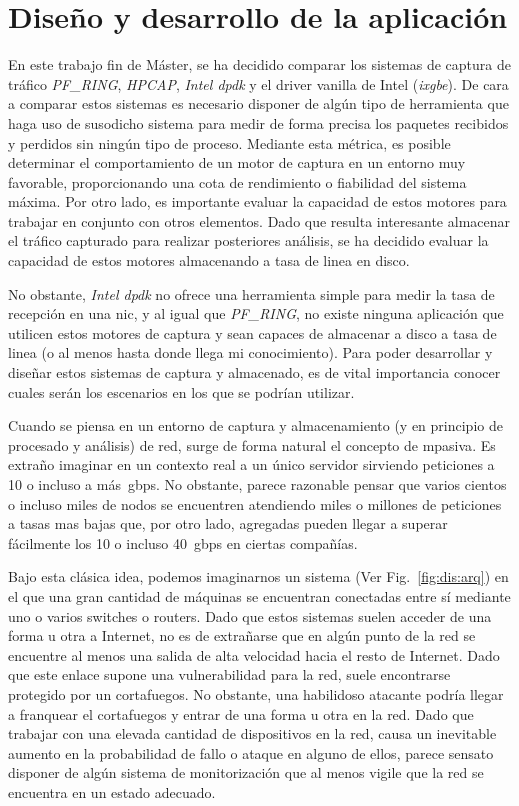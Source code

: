 \chapter{Diseño y desarrollo de la aplicación\label{sec:disenho}}

En este trabajo fin de Máster, se ha decidido comparar los sistemas de captura de tráfico \textit{PF\_RING}, \textit{HPCAP}, \textit{Intel \gls{dpdk}} y el driver \gls{vanilla} de Intel (\textit{ixgbe}).
De cara a comparar estos sistemas es necesario disponer de algún tipo de herramienta que haga uso de susodicho sistema para medir de forma precisa los paquetes recibidos y perdidos sin ningún tipo de proceso.
Mediante esta métrica, es posible determinar el comportamiento de un motor de captura en un entorno muy favorable, proporcionando una cota de rendimiento o fiabilidad del sistema máxima. 
Por otro lado, es importante evaluar la capacidad de estos motores para trabajar en conjunto con otros elementos. Dado que resulta interesante almacenar el tráfico capturado para realizar posteriores análisis, se ha decidido evaluar la capacidad de estos motores almacenando a tasa de linea en disco.

No obstante, \textit{Intel \gls{dpdk}} no ofrece una herramienta simple para medir la tasa de recepción en una \gls{nic}, y al igual que \textit{PF\_RING}, no existe ninguna aplicación que utilicen estos motores de captura y sean capaces de almacenar a disco a tasa de linea (o al menos hasta donde llega mi conocimiento). Para poder desarrollar y diseñar estos sistemas de captura y almacenado, es de vital importancia conocer cuales serán los escenarios en los que se podrían utilizar.


Cuando se piensa en un entorno de captura y almacenamiento (y en principio de procesado y análisis) de red, surge de forma natural el concepto de \gls{mpasiva}. Es extraño imaginar en un contexto real a un único servidor sirviendo peticiones a 10 o incluso a más~\gls{gbps}. No obstante, parece razonable pensar que varios cientos o incluso miles de nodos se encuentren atendiendo miles o millones de peticiones a tasas mas bajas que, por otro lado, agregadas pueden llegar a superar fácilmente los 10 o incluso 40~\gls{gbps} en ciertas compañías.

Bajo esta clásica idea, podemos imaginarnos un sistema (Ver Fig.~\ref{fig:dis:arq}) en el que una gran cantidad de máquinas se encuentran conectadas entre sí mediante uno o varios switches o routers. Dado que estos sistemas suelen acceder de una forma u otra a Internet, no es de extrañarse que en algún punto de la red se encuentre al menos una salida de alta velocidad hacia el resto de Internet. Dado que este enlace supone una vulnerabilidad para la red, suele encontrarse protegido por un cortafuegos. No obstante, una habilidoso atacante podría llegar a franquear el cortafuegos y entrar de una forma u otra en la red.
Dado que trabajar con una elevada cantidad de dispositivos en la red, causa un inevitable aumento en la probabilidad de fallo o ataque en alguno de ellos, parece sensato disponer de algún sistema de monitorización que al menos vigile que la red se encuentra en un estado adecuado. 

